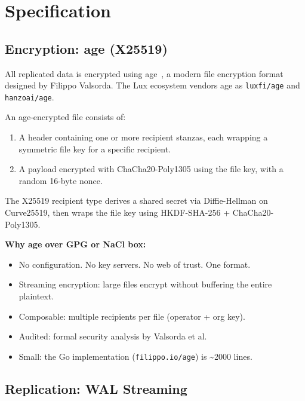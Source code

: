 \section{Specification}
\label{sec:spec}

\subsection{Encryption: age (X25519)}\label{sec:age}

All replicated data is encrypted using age~\cite{age}, a modern
file encryption format designed by Filippo Valsorda. The Lux
ecosystem vendors age as \texttt{luxfi/age} and \texttt{hanzoai/age}.

\begin{definition}\label{def:age}
An age-encrypted file consists of:
\begin{enumerate}[nosep]
  \item A header containing one or more recipient stanzas, each
    wrapping a symmetric file key for a specific recipient.
  \item A payload encrypted with ChaCha20-Poly1305 using the file
    key, with a random 16-byte nonce.
\end{enumerate}
The X25519 recipient type derives a shared secret via Diffie-Hellman
on Curve25519, then wraps the file key using HKDF-SHA-256 +
ChaCha20-Poly1305.
\end{definition}

\noindent\textbf{Why age over GPG or NaCl box:}

\begin{itemize}[nosep]
  \item No configuration. No key servers. No web of trust. One format.
  \item Streaming encryption: large files encrypt without buffering
    the entire plaintext.
  \item Composable: multiple recipients per file (operator + org key).
  \item Audited: formal security analysis by Valsorda et al.
  \item Small: the Go implementation (\texttt{filippo.io/age}) is
    \textasciitilde2000 lines.
\end{itemize}

\subsection{Replication: WAL Streaming}\label{sec:replication}

